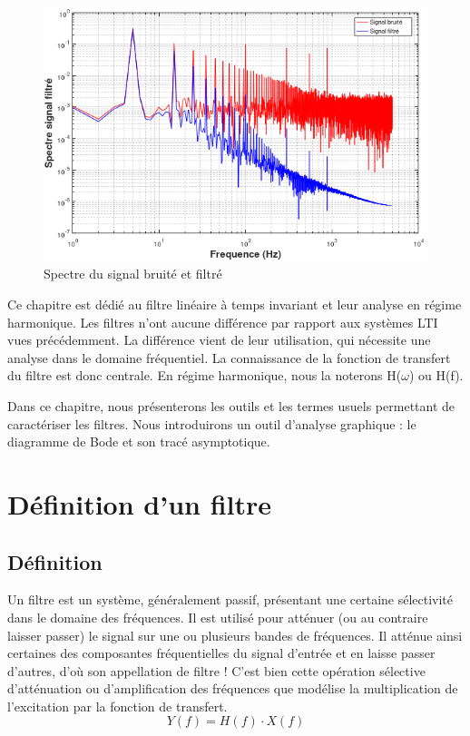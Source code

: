 	\begin{figure}[h]
		\centering
		\includegraphics[scale=0.6]{images/Effet_filtre_bruit_spectre.png}
		\caption{Spectre du signal bruité et filtré}	
		\label{Fig:Effet_filtre_bruit_spectre} 
	\end{figure}
	
	
	Ce chapitre est dédié au filtre linéaire à temps invariant et leur analyse en régime harmonique. Les filtres n'ont aucune différence par rapport aux systèmes LTI vues précédemment. La différence vient de leur utilisation, qui nécessite une analyse dans le domaine fréquentiel. La connaissance de la fonction de transfert du filtre est donc centrale. En régime harmonique, nous la noterons H($\omega$) ou H(f).
	
	Dans ce chapitre, nous présenterons les outils et les termes usuels permettant de caractériser les filtres. Nous introduirons un outil d'analyse graphique : le diagramme de Bode et son tracé asymptotique.  
	

	
	\section{Définition d'un filtre}
	
	\subsection{Définition}
	
	Un filtre est un système, généralement passif, présentant une certaine sélectivité dans le domaine des fréquences. Il est utilisé pour atténuer (ou au contraire laisser passer) le signal sur une ou plusieurs bandes de fréquences.
	Il atténue ainsi certaines des composantes fréquentielles du signal d’entrée et en laisse passer d’autres, d’où son appellation de filtre ! C’est bien cette opération sélective d’atténuation ou d’amplification des fréquences que modélise la multiplication de l'excitation par la fonction de transfert.
	\begin{equation}\label{}
	Y(f) = H(f) \cdot X(f)
	\end{equation}

